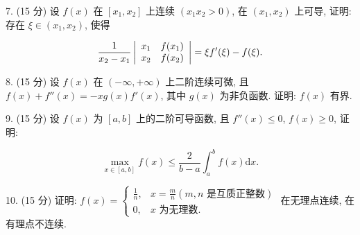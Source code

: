 \documentclass{examcollection}
\renewcommand{\displayformula}[1]{\[#1\]}
\begin{document}
{\begin{minipage}{\textwidth}
7. (15 分) 设 $f(x)$ 在 $[x_1, x_2]$ 上连续 $(x_1 x_2 > 0)$, 在 $(x_1, x_2)$ 上可导, 证明: 存在 $\xi \in (x_1, x_2)$, 使得\par
\displayformula{\frac {1}{x _ {2} - x _ {1}} \left| \begin{array}{l l} x _ {1} & f (x _ {1}) \\ x _ {2} & f (x _ {2}) \end{array} \right| = \xi f ^ {\prime} (\xi) - f (\xi).}\par
8. (15 分) 设 $f(x)$ 在 $(- \infty, + \infty)$ 上二阶连续可微, 且 $f(x) + f''(x) = -xg(x)f'(x)$, 其中 $g(x)$ 为非负函数. 证明: $f(x)$ 有界.\par
9. (15 分) 设 $f(x)$ 为 $[a, b]$ 上的二阶可导函数, 且 $f''(x) \leq 0$, $f(x) \geq 0$, 证明:\par
\displayformula{\max _ {x \in [ a, b ]} f (x) \leq \frac {2}{b - a} \int_ {a} ^ {b} f (x) \mathrm{d} x.}\par
10. (15 分) 证明: $f(x) = \begin{cases} \frac{1}{n}, & x = \frac{m}{n} (m, n \text{ 是互质正整数}) \\ 0, & x \text{ 为无理数}. \end{cases}$ 在无理点连续, 在有理点不连续.\par
\end{minipage}}
\ifdim\dimexpr\ht\proofbox+\dp\proofbox\relax>\textheight
\noindent\resizebox{!}{\textheight}{\usebox{\proofbox}}\else\noindent\usebox{\proofbox}\fi\clearpage
\end{document}
